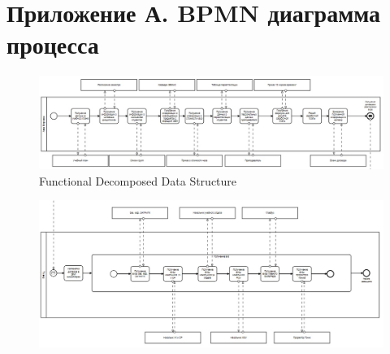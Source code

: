 \documentclass[14pt]{extarticle}
\begin{document}
\section*{Приложение А. BPMN диаграмма процесса}

\begin{landscape}\centering
\begin{figure}[h!]
  \centering
  \includegraphics[width=1.5\textwidth]{BPMN1.jpg}
  \caption{Functional Decomposed Data Structure}
\end{figure}
\vfill
\end{landscape}

\newpage

\begin{figure}[h!]
 \centering
 \includegraphics[width=1.5\textwidth]{BPMN2.jpg}
\end{figure}
 
\end{document}
